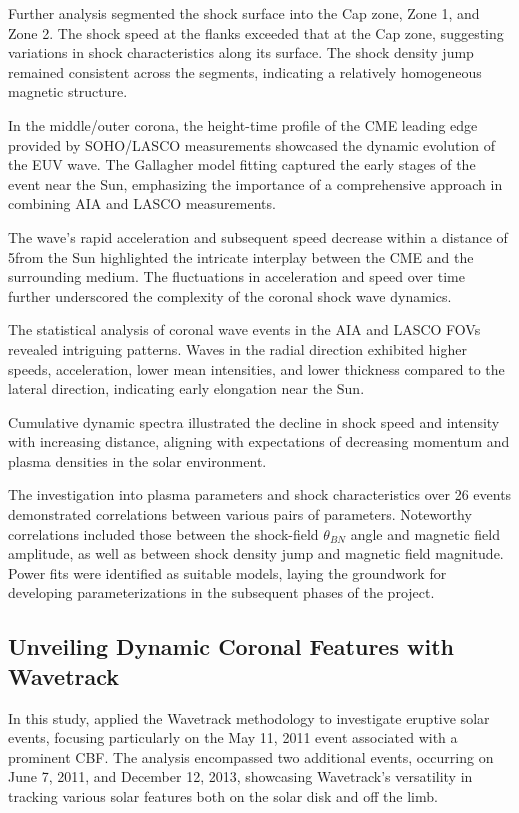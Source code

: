 Further analysis segmented the shock surface into the Cap zone, Zone 1, and Zone 2. The shock speed at the flanks exceeded that at the Cap zone, suggesting variations in shock characteristics along its surface. The shock density jump remained consistent across the segments, indicating a relatively homogeneous magnetic structure.

In the middle/outer corona, the height-time profile of the CME leading edge provided by SOHO/LASCO measurements showcased the dynamic evolution of the EUV wave. The Gallagher model fitting captured the early stages of the event near the Sun, emphasizing the importance of a comprehensive approach in combining AIA and LASCO measurements.

The wave's rapid acceleration and subsequent speed decrease within a distance of 5\rsun from the Sun highlighted the intricate interplay between the CME and the surrounding medium. The fluctuations in acceleration and speed over time further underscored the complexity of the coronal shock wave dynamics.

The statistical analysis of coronal wave events in the AIA and LASCO FOVs revealed intriguing patterns. Waves in the radial direction exhibited higher speeds, acceleration, lower mean intensities, and lower thickness compared to the lateral direction, indicating early elongation near the Sun.

Cumulative dynamic spectra illustrated the decline in shock speed and intensity with increasing distance, aligning with expectations of decreasing momentum and plasma densities in the solar environment.

The investigation into plasma parameters and shock characteristics over 26 events demonstrated correlations between various pairs of parameters. Noteworthy correlations included those between the shock-field $\theta_{BN}$ angle and magnetic field amplitude, as well as between shock density jump and magnetic field magnitude.
Power fits were identified as suitable models, laying the groundwork for developing parameterizations in the subsequent phases of the project.

\subsection{Unveiling Dynamic Coronal Features with Wavetrack}
In this study, \citet{stepanyuk_2022} applied the Wavetrack methodology to investigate eruptive solar events, focusing particularly on the May 11, 2011 event associated with a prominent CBF. The analysis encompassed two additional events, occurring on June 7, 2011, and December 12, 2013, showcasing Wavetrack's versatility in tracking various solar features both on the solar disk and off the limb.

